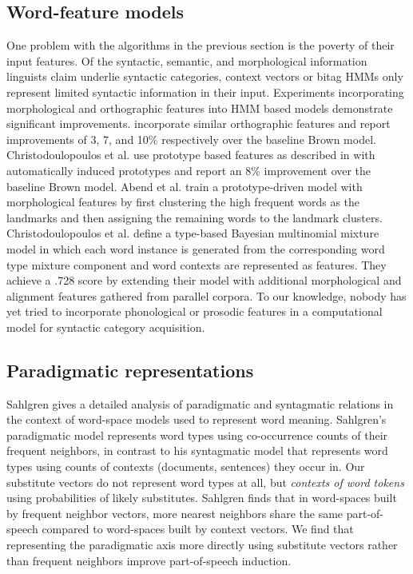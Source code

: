 \subsection{Word-feature models}
One problem with the algorithms in the previous section is the poverty
of their input features.  Of the syntactic, semantic, and
morphological information linguists claim underlie syntactic
categories, context vectors or bitag HMMs only represent limited
syntactic information in their input.  Experiments incorporating
morphological and orthographic features into HMM based models
demonstrate significant improvements.
\cite{Clark:2003:CDM:1067807.1067817,bergkirkpatrick-klein:2010:ACL,blunsom-cohn:2011:ACL-HLT2011}
incorporate similar orthographic features and report improvements of
3, 7, and 10\% respectively over the baseline Brown model.
Christodoulopoulos et
al.  use
prototype based features as described in
\cite{Haghighi:2006:PLS:1220835.1220876} with automatically induced
prototypes and report an 8\% improvement over the baseline Brown
model.  Abend et al.  train
a prototype-driven model with morphological features by first
clustering the high frequent words as the landmarks and then assigning
the remaining words to the landmark clusters.  Christodoulopoulos et
al. 
define a type-based Bayesian multinomial mixture model in which each
word instance is generated from the corresponding word type mixture
component and word contexts are represented as features.  They achieve
a .728 \mto score by extending their model with additional
morphological and alignment features gathered from parallel corpora.
To our knowledge, nobody has yet tried to incorporate phonological or
prosodic features in a computational model for syntactic category
acquisition.

\subsection{Paradigmatic representations}

Sahlgren  gives a detailed analysis of
paradigmatic and syntagmatic relations in the context of word-space
models used to represent word meaning.  Sahlgren's paradigmatic model
represents word types using co-occurrence counts of their frequent
neighbors, in contrast to his syntagmatic model that represents word
types using counts of contexts (documents, sentences) they occur in.
Our substitute vectors do not represent word types at all, but {\em
  contexts of word tokens} using probabilities of likely substitutes.
Sahlgren finds that in word-spaces built by frequent neighbor vectors,
more nearest neighbors share the same part-of-speech compared to
word-spaces built by context vectors.  We find that representing the
paradigmatic axis more directly using substitute vectors rather than
frequent neighbors improve part-of-speech induction.

